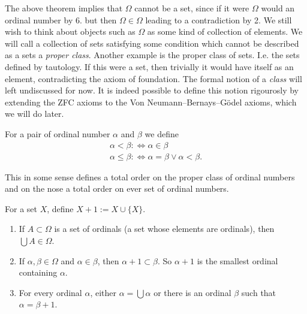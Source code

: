 \begin{remark}
    The above theorem implies that $\Omega$ cannot be a set, since if it were $\Omega$ would an ordinal number by 6. but then $\Omega\in \Omega$ leading to a contradiction by 2. We still wish to think about objects such as $\Omega$ as some kind of collection of elements. We will call a collection of sets satisfying some condition which cannot be described as a sets a \textit{proper class}. Another example is the proper class of sets. I.e. the sets defined by tautology. If this were a set, then trivially it would have itself as an element, contradicting the axiom of foundation. The formal notion of a \textit{class} will left undiscussed for now. It is indeed possible to define this notion rigourosly by extending the ZFC axioms to the Von Neumann–Bernays–Gödel axioms, which we will do later. 
\end{remark}
\begin{definition}
    For a pair of ordinal number $\alpha$ and $\beta$ we define 
    \begin{gather*}
        \alpha <\beta :\iff \alpha \in \beta\\
        \alpha \leq \beta :\iff \alpha = \beta \vee \alpha <\beta.
    \end{gather*}
\end{definition}
\begin{remark}
    This in some sense defines a total order on the proper class of ordinal numbers and on the nose a total order on ever set of ordinal numbers. 
\end{remark}
\begin{definition}
    For a set $X$, define $X+1:= X\cup\{X\}$.
\end{definition}
\begin{corollary}\label{ClosurePropertiesOfOrdinals}
    \begin{enumerate}
        \item If $A\subset \Omega$ is a set of ordinals (a set whose elements are ordinals), then $\bigcup A \in \Omega$.  
        \item If $\alpha,\beta\in \Omega$ and $\alpha\in \beta$, then $\alpha+1\subset \beta$. So $\alpha+1$ is the smallest ordinal containing $\alpha$. 
        \item For every ordinal $\alpha$, either $\alpha = \bigcup \alpha$ or there is an ordinal $\beta$ such that $\alpha = \beta+1$.
    \end{enumerate}
\end{corollary}
